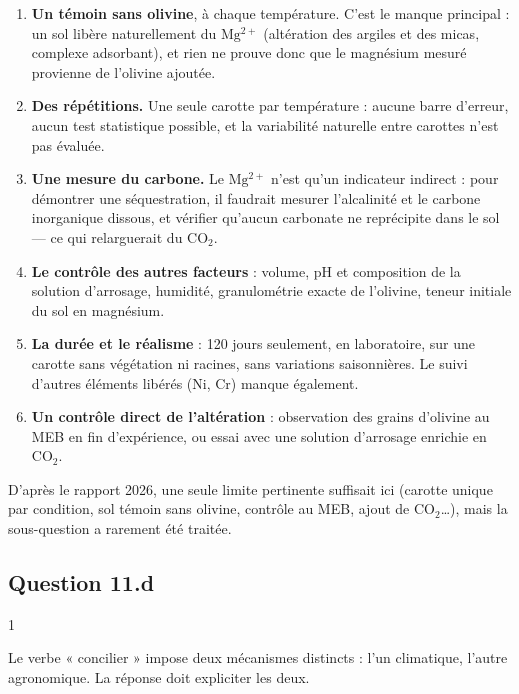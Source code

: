 \documentclass[11pt,a4paper]{article}
\providecommand{\tightlist}{\setlength{\itemsep}{0pt}\setlength{\parskip}{0pt}}
\begin{document}
\begin{enumerate}
\def\labelenumi{\arabic{enumi}.}
\tightlist
\item
  \textbf{Un témoin sans olivine}, à chaque température. C'est le manque principal : un sol libère naturellement du \(\mathrm{Mg^{2+}}\) (altération des argiles et des micas, complexe adsorbant), et rien ne prouve donc que le magnésium mesuré provienne de l'olivine ajoutée.
\item
  \textbf{Des répétitions.} Une seule carotte par température : aucune barre d'erreur, aucun test statistique possible, et la variabilité naturelle entre carottes n'est pas évaluée.
\item
  \textbf{Une mesure du carbone.} Le \(\mathrm{Mg^{2+}}\) n'est qu'un indicateur indirect : pour démontrer une séquestration, il faudrait mesurer l'alcalinité et le carbone inorganique dissous, et vérifier qu'aucun carbonate ne reprécipite dans le sol --- ce qui relarguerait du \(\mathrm{CO_2}\).
\item
  \textbf{Le contrôle des autres facteurs} : volume, pH et composition de la solution d'arrosage, humidité, granulométrie exacte de l'olivine, teneur initiale du sol en magnésium.
\item
  \textbf{La durée et le réalisme} : 120 jours seulement, en laboratoire, sur une carotte sans végétation ni racines, sans variations saisonnières. Le suivi d'autres éléments libérés (Ni, Cr) manque également.
\item
  \textbf{Un contrôle direct de l'altération} : observation des grains d'olivine au MEB en fin d'expérience, ou essai avec une solution d'arrosage enrichie en \(\mathrm{CO_2}\).
\end{enumerate}

\begin{jury}

D'après le rapport 2026, une seule limite pertinente suffisait ici (carotte unique par condition, sol témoin sans olivine, contrôle au MEB, ajout de \(\mathrm{CO_2}\)\ldots), mais la sous-question a rarement été traitée.

\end{jury}

\hypertarget{question-11.d}{%
\subsection{Question 11.d}\label{question-11.d}}

\begin{indication}{1}

Le verbe « concilier » impose deux mécanismes distincts : l'un climatique, l'autre agronomique. La réponse doit expliciter les deux.

\end{indication}
\end{document}
